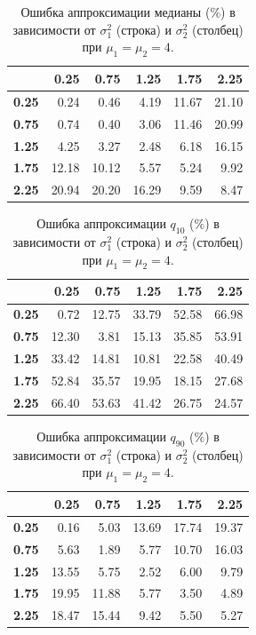 \documentclass[specialist, substylefile = spbu.rtx,
subf,href,colorlinks=true, 12pt]{disser}
\begin{document}

\begin{table}[!hhh]
	\centering
	\caption{Ошибка аппроксимации медианы ($\%$) в зависимости от $\sigma_{1}^{2}$ (строка) и $\sigma_{2}^{2}$ (столбец) при $\mu_{1} = \mu_{2} = 4$.}
	\label{tab1}
	\begin{tabular}{rrrrrr}
		\hline
		& \textbf{0.25} & \textbf{0.75} & \textbf{1.25} & \textbf{1.75} & \textbf{2.25} \\ 
		\hline
		\textbf{0.25} & 0.24 & 0.46 & 4.19 & 11.67 & 21.10 \\ 
		\textbf{0.75} & 0.74 & 0.40 & 3.06 & 11.46 & 20.99 \\ 
		\textbf{1.25} & 4.25 & 3.27 & 2.48 & 6.18 & 16.15 \\ 
		\textbf{1.75} & 12.18 & 10.12 & 5.57 & 5.24 & 9.92 \\ 
		\textbf{2.25} & 20.94 & 20.20 & 16.29 & 9.59 & 8.47 \\ 
		\hline
	\end{tabular}
\end{table}

\begin{table}[!hhh]
	\centering
	\caption{Ошибка аппроксимации $q_{10}$ ($\%$) в зависимости от $\sigma_{1}^{2}$ (строка) и $\sigma_{2}^{2}$ (столбец) при $\mu_{1} = \mu_{2} = 4$.}
	\label{tab2}
	\begin{tabular}{rrrrrr}
		\hline
		& \textbf{0.25} & \textbf{0.75} & \textbf{1.25} & \textbf{1.75} & \textbf{2.25} \\ 
		\hline
		\textbf{0.25} & 0.72 & 12.75 & 33.79 & 52.58 & 66.98 \\ 
		\textbf{0.75} & 12.30 & 3.81 & 15.13 & 35.85 & 53.91 \\ 
		\textbf{1.25} & 33.42 & 14.81 & 10.81 & 22.58 & 40.49 \\ 
		\textbf{1.75} & 52.84 & 35.57 & 19.95 & 18.15 & 27.68 \\ 
		\textbf{2.25} & 66.40 & 53.63 & 41.42 & 26.75 & 24.57 \\ 
		\hline
	\end{tabular}
\end{table}

\begin{table}[!hhh]
	\centering
	\caption{Ошибка аппроксимации $q_{90}$ ($\%$) в зависимости от $\sigma_{1}^{2}$ (строка) и $\sigma_{2}^{2}$ (столбец) при $\mu_{1} = \mu_{2} = 4$.}
	\label{tab3}
	\begin{tabular}{rrrrrr}
		\hline
		& \textbf{0.25} & \textbf{0.75} & \textbf{1.25} & \textbf{1.75} & \textbf{2.25} \\ 
		\hline
		\textbf{0.25} & 0.16 & 5.03 & 13.69 & 17.74 & 19.37 \\ 
		\textbf{0.75} & 5.63 & 1.89 & 5.77 & 10.70 & 16.03 \\ 
		\textbf{1.25} & 13.55 & 5.75 & 2.52 & 6.00 & 9.79 \\ 
		\textbf{1.75} & 19.95 & 11.88 & 5.77 & 3.50 & 4.89 \\ 
		\textbf{2.25} & 18.47 & 15.44 & 9.42 & 5.50 & 5.27 \\ 
		\hline
	\end{tabular}
\end{table}
\end{document}
